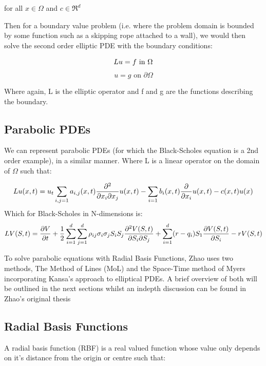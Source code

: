 \documentclass[a4paper]{amsart}
\begin{document}
for all $ x \in \Omega$ and $c \in \Re^{d}$

Then for a boundary value problem (i.e. where the problem domain is bounded by some function such as a skipping rope attached to a wall), we would then solve the second order elliptic PDE with the boundary conditions:

\begin{equation} \label{eq:EPDE1}
Lu = f \mbox{ in } \Omega \\
\end{equation}
\begin{equation} \label{eq:EPDE2}
u = g \mbox{ on } \partial \Omega
\end{equation}

Where again, L is the elliptic operator and f and g are the functions describing the boundary.

\subsection{Parabolic PDEs}
We can represent parabolic PDEs (for which the Black-Scholes equation is a 2nd order example), in a similar manner. Where L is a linear operator on the domain of $\Omega$ such that:

\begin{equation}
Lu(x,t) = u_{t} \sum_{i,j=1} a_{i,j}(x,t) \pdv{}{x_i}{x_j} u(x,t) - \sum_{i=1} b_{i}(x,t) \pdv{}{x_i} u(x,t) - c(x,t) u(x)
\label{PPDE}
\end{equation}
Which for Black-Scholes in N-dimensions is:
\begin{equation}
LV(S,t) = \pdv{V}{t} + \frac{1}{2} \sum^{d}_{i=1} \sum^{d}_{j=1} \rho_{ij} \sigma_{i} \sigma_{j} S_{i} S_{j} \pdv{V(S,t)}{S_{i}}{S_{j}}+ \sum^{d}_{i=1}(r-q_{i})S_{1} \pdv{V(S,t)}{S_{i}} - rV(S,t)
\end{equation}

To solve parabolic equations with Radial Basis Functions, Zhao uses two methods, The Method of Lines (MoL) and the Space-Time method of Myers incorporating Kansa's approach to elliptical PDEs. A brief overview of both will be outlined in the next sections whilst an indepth discussion can be found in Zhao's original thesis \cite{mski0}

\subsection{Radial Basis Functions}\label{sec:RBF}

A radial basis function (RBF) is a real valued function whose value only depends on it's distance from the origin or centre such that:
\end{document}
